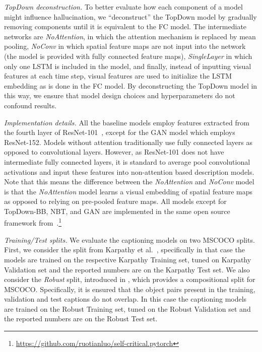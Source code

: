 \textit{TopDown deconstruction.} %
%
To better evaluate how each component of a model might influence hallucination, we ``deconstruct'' the TopDown model by gradually removing components until it is equivalent to the FC model. 
The intermediate networks are \textit{NoAttention}, in which the attention mechanism is replaced by mean pooling, \textit{NoConv} in which spatial feature maps are not input into the network (the model is provided with fully connected feature maps), \textit{SingleLayer} in which only one LSTM is included in the model, and finally, instead of inputting visual features at each time step, visual features are used to initialize the LSTM embedding as is done in the FC model.  By deconstructing the TopDown model in this way, we ensure that model design choices and hyperparameters do not confound results.

\textit{Implementation details.}
All the baseline models employ features extracted from the fourth layer of ResNet-101~\cite{he2016deep}, except for the GAN model which employs ResNet-152.
Models without attention traditionally use fully connected layers as opposed to convolutional layers.
However, as ResNet-101 does not have intermediate fully connected layers, it is standard to average pool convolutional activations and input these features into non-attention based description models.
Note that this means the difference between the \textit{NoAttention} and \textit{NoConv} model is that the \textit{NoAttention} model learns a visual embedding of spatial feature maps as opposed to relying on pre-pooled feature maps.
%
All models except for TopDown-BB, NBT, and GAN are implemented in the same open source framework from~\citet{luo2018discriminability}.\footnote{\url{https://github.com/ruotianluo/self-critical.pytorch}}

%
\textit{Training/Test splits.}
We evaluate the captioning models on two MSCOCO splits. First, we consider the split from Karpathy et al.~\cite{karpathy2015deep}, specifically in that case the models are trained on the respective Karpathy Training set, tuned on Karpathy Validation set and the reported numbers are on the Karpathy Test set.
We also consider the \emph{Robust} split, introduced in \cite{lu2018neural}, which provides a compositional split for MSCOCO. Specifically, it is ensured that the object pairs present in the training, validation and test captions do not overlap. %
In this case the captioning models are trained on the Robust Training set, tuned on the Robust Validation set and the reported numbers are on the Robust Test set.
%
%

